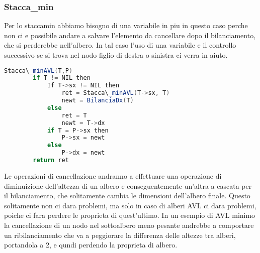 \subsubsection{Stacca\_min}
Per lo staccamin abbiamo bisogno di una variabile in piu in questo caso perche non ci e possibile andare a salvare l'elemento da cancellare dopo il bilanciamento, che si perderebbe nell'albero. In tal caso l'uso di una variabile e il controllo successivo se si trova nel nodo figlio di destra o sinistra ci verra in aiuto.

\begin{lstlisting}[language=Java]
	Stacca\_minAVL(T,P)
		if T != NIL then
			If T->sx != NIL then
				ret = Stacca\_minAVL(T->sx, T)
				newt = BilanciaDx(T)
			else
				ret = T
				newt = T->dx
			if T = P->sx then
				P->sx = newt
			else
				P->dx = newt
		return ret
\end{lstlisting}

Le operazioni di cancellazione andranno a effettuare una operazione di diminuizione dell'altezza di un albero e conseguentemente un'altra a cascata per il bilanciamento, che solitamente cambia le dimensioni dell'albero finale. Questo solitamente non ci dara problemi, ma solo in caso di alberi AVL ci dara problemi, poiche ci fara perdere le proprieta di quest'ultimo.
\medskip
In un esempio di AVL minimo la cancellazione di un nodo nel sottoalbero meno pesante andrebbe a comportare un ribilanciamento che va a peggiorare la differenza delle altezze tra alberi, portandola a 2, e qundi perdendo la proprieta di albero.


